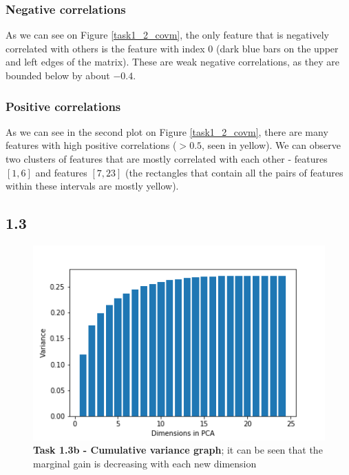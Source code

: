 \documentclass[12pt]{article}
\begin{document}
\subsubsection*{Negative correlations}
As we can see on Figure \ref{task1_2_covm}, the only feature that is negatively correlated with others is the feature with index $0$ (dark blue bars on the upper and left edges of the matrix). These are weak negative correlations, as they are bounded below by about $-0.4$.
\subsubsection*{Positive correlations}
As we can see in the second plot on Figure \ref{task1_2_covm}, there are many features with high positive correlations ($>0.5$, seen in yellow). We can observe two clusters of features that are mostly correlated with each other - features $[1,6]$ and features $[7,23]$ (the rectangles that contain all the pairs of features within these intervals are mostly yellow).

\newpage
\subsection*{1.3}

\begin{figure}[!htb]
\centering
\includegraphics[scale=0.7]{task1_3b_cumvar_graph.png}
\caption{\textbf{Task 1.3b - Cumulative variance graph}; it can be seen that the marginal gain is decreasing with each new dimension}
\end{figure}
\end{document}
